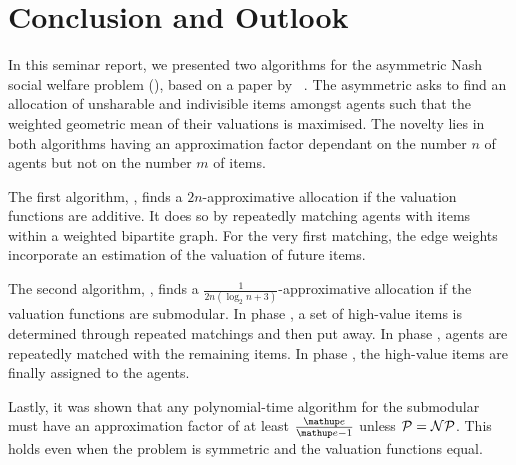 \section{Conclusion and Outlook}
\label{sec:conclusion}

In this seminar report, we presented two algorithms for the asymmetric Nash social welfare problem (\NSW), based on a paper by \citeauthor{APNSWuSVþUM}~\cite{APNSWuSVþUM}.
The asymmetric \NSW{} asks to find an allocation of unsharable and indivisible items amongst agents such that the weighted geometric mean of their valuations is maximised.
The novelty lies in both algorithms having an approximation factor dependant on the number \(n\) of agents but not on the number \(m\) of items.

The first algorithm, \SMatch, finds a \(2n\)-approximative allocation if the valuation functions are additive.
It does so by repeatedly matching agents with items within a weighted bipartite graph.
For the very first matching, the edge weights incorporate an estimation of the valuation of future items.

The second algorithm, \RepReMatch, finds a \(\frac{1}{2n(\log_2 n + 3)}\)-approximative allocation if the valuation functions are submodular.
In phase \phasei, a set of high-value items is determined through repeated matchings and then put away.
In phase \phaseii, agents are repeatedly matched with the remaining items.
In phase \phaseiii, the high-value items are finally assigned to the agents.

Lastly, it was shown that any polynomial-time algorithm for the submodular \NSW{} must have an approximation factor of at least \(\frac{\euler}{\euler - 1}\) unless \(\mathcal{P} = \mathcal{NP}\).
This holds even when the problem is symmetric and the valuation functions equal.

\medskip

